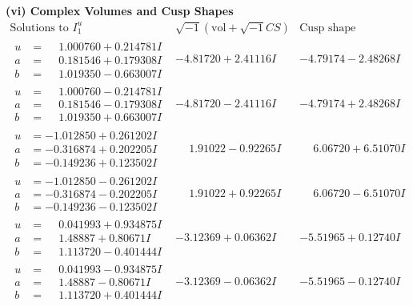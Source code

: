 \documentclass[1p]{elsarticle_modified}
\theoremstyle{definition}
\newcommand{\I}{\sqrt{-1}}
\begin{document}
\newpage\flushleft \textbf{(vi) Complex Volumes and Cusp Shapes}
$$\begin{array}{c|c|c}  
\text{Solutions to }I^u_{1}& \I (\text{vol} + \sqrt{-1}CS) & \text{Cusp shape}\\
 \hline 
\begin{aligned}
u &= \phantom{-}1.000760 + 0.214781 I \\
a &= \phantom{-}0.181546 + 0.179308 I \\
b &= \phantom{-}1.019350 - 0.663007 I\end{aligned}
 & -4.81720 + 2.41116 I & -4.79174 - 2.48268 I \\ \hline\begin{aligned}
u &= \phantom{-}1.000760 - 0.214781 I \\
a &= \phantom{-}0.181546 - 0.179308 I \\
b &= \phantom{-}1.019350 + 0.663007 I\end{aligned}
 & -4.81720 - 2.41116 I & -4.79174 + 2.48268 I \\ \hline\begin{aligned}
u &= -1.012850 + 0.261202 I \\
a &= -0.316874 + 0.202205 I \\
b &= -0.149236 + 0.123502 I\end{aligned}
 & \phantom{-}1.91022 - 0.92265 I & \phantom{-}6.06720 + 6.51070 I \\ \hline\begin{aligned}
u &= -1.012850 - 0.261202 I \\
a &= -0.316874 - 0.202205 I \\
b &= -0.149236 - 0.123502 I\end{aligned}
 & \phantom{-}1.91022 + 0.92265 I & \phantom{-}6.06720 - 6.51070 I \\ \hline\begin{aligned}
u &= \phantom{-}0.041993 + 0.934875 I \\
a &= \phantom{-}1.48887 + 0.80671 I \\
b &= \phantom{-}1.113720 - 0.401444 I\end{aligned}
 & -3.12369 + 0.06362 I & -5.51965 + 0.12740 I \\ \hline\begin{aligned}
u &= \phantom{-}0.041993 - 0.934875 I \\
a &= \phantom{-}1.48887 - 0.80671 I \\
b &= \phantom{-}1.113720 + 0.401444 I\end{aligned}
 & -3.12369 - 0.06362 I & -5.51965 - 0.12740 I \\ \hline\begin{aligned}

\end{aligned}
\end{array}$$
\end{document}
